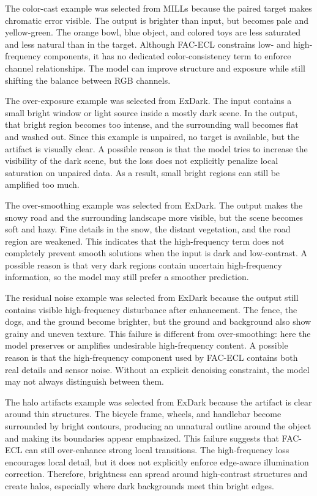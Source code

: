 The color-cast example was selected from MILLs because the paired target makes chromatic error visible. The output is brighter than input, but becomes pale and yellow-green. The orange bowl, blue object, and colored toys are less saturated and less natural than in the target. Although FAC-ECL constrains low- and high-frequency components, it has no dedicated color-consistency term to enforce channel relationships. The model can improve structure and exposure while still shifting the balance between RGB channels.

The over-exposure example was selected from ExDark. The input contains a small bright window or light source inside a mostly dark scene. In the output, that bright region becomes too intense, and the surrounding wall becomes flat and washed out. Since this example is unpaired, no target is available, but the artifact is visually clear. A possible reason is that the model tries to increase the visibility of the dark scene, but the loss does not explicitly penalize local saturation on unpaired data. As a result, small bright regions can still be amplified too much.

The over-smoothing example was selected from ExDark. The output makes the snowy road and the surrounding landscape more visible, but the scene becomes soft and hazy. Fine details in the snow, the distant vegetation, and the road region are weakened. This indicates that the high-frequency term does not completely prevent smooth solutions when the input is dark and low-contrast. A possible reason is that very dark regions contain uncertain high-frequency information, so the model may still prefer a smoother prediction.

The residual noise example was selected from ExDark because the output still contains visible high-frequency disturbance after enhancement. The fence, the dogs, and the ground become brighter, but the ground and background also show grainy and uneven texture. This failure is different from over-smoothing: here the model preserves or amplifies undesirable high-frequency content. A possible reason is that the high-frequency component used by FAC-ECL contains both real details and sensor noise. Without an explicit denoising constraint, the model may not always distinguish between them.

The halo artifacts example was selected from ExDark because the artifact is clear around thin structures. The bicycle frame, wheels, and handlebar become surrounded by bright contours, producing an unnatural outline around the object and making its boundaries appear emphasized. This failure suggests that FAC-ECL can still over-enhance strong local transitions. The high-frequency loss encourages local detail, but it does not explicitly enforce edge-aware illumination correction. Therefore, brightness can spread around high-contrast structures and create halos, especially where dark backgrounds meet thin bright edges.

